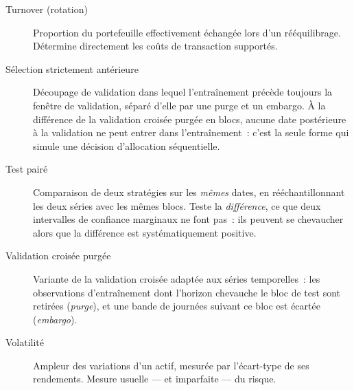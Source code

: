 \begin{description}
\item[Turnover (rotation)] Proportion du portefeuille effectivement échangée lors
d'un rééquilibrage. Détermine directement les coûts de transaction supportés.

\item[Sélection strictement antérieure] Découpage de validation dans lequel
l'entraînement précède toujours la fenêtre de validation, séparé d'elle par une
purge et un embargo. À la différence de la validation croisée purgée en blocs,
aucune date postérieure à la validation ne peut entrer dans l'entraînement~:
c'est la seule forme qui simule une décision d'allocation séquentielle.

\item[Test pairé] Comparaison de deux stratégies sur les \emph{mêmes} dates, en
rééchantillonnant les deux séries avec les mêmes blocs. Teste la
\emph{différence}, ce que deux intervalles de confiance marginaux ne font pas~:
ils peuvent se chevaucher alors que la différence est systématiquement positive.

\item[Validation croisée purgée] Variante de la validation croisée adaptée aux
séries temporelles~: les observations d'entraînement dont l'horizon chevauche le
bloc de test sont retirées (\emph{purge}), et une bande de journées suivant ce
bloc est écartée (\emph{embargo}).

\item[Volatilité] Ampleur des variations d'un actif, mesurée par l'écart-type de
ses rendements. Mesure usuelle — et imparfaite — du risque.

\end{description}
